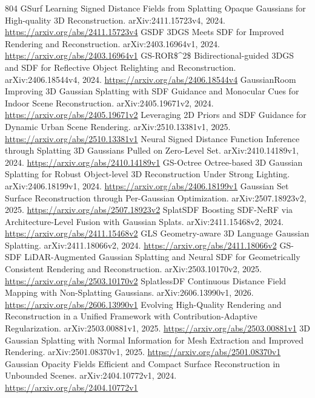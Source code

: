 \documentclass[11pt]{article}
\begin{document}
\begin{thebibliography}{804}
 GSurf Learning Signed Distance Fields from Splatting Opaque Gaussians for High-quality 3D Reconstruction. arXiv:2411.15723v4, 2024. \url{https://arxiv.org/abs/2411.15723v4}
 GSDF 3DGS Meets SDF for Improved Rendering and Reconstruction. arXiv:2403.16964v1, 2024. \url{https://arxiv.org/abs/2403.16964v1}
 GS-ROR\$\textasciicircum{}2\$ Bidirectional-guided 3DGS and SDF for Reflective Object Relighting and Reconstruction. arXiv:2406.18544v4, 2024. \url{https://arxiv.org/abs/2406.18544v4}
 GaussianRoom Improving 3D Gaussian Splatting with SDF Guidance and Monocular Cues for Indoor Scene Reconstruction. arXiv:2405.19671v2, 2024. \url{https://arxiv.org/abs/2405.19671v2}
 Leveraging 2D Priors and SDF Guidance for Dynamic Urban Scene Rendering. arXiv:2510.13381v1, 2025. \url{https://arxiv.org/abs/2510.13381v1}
 Neural Signed Distance Function Inference through Splatting 3D Gaussians Pulled on Zero-Level Set. arXiv:2410.14189v1, 2024. \url{https://arxiv.org/abs/2410.14189v1}
 GS-Octree Octree-based 3D Gaussian Splatting for Robust Object-level 3D Reconstruction Under Strong Lighting. arXiv:2406.18199v1, 2024. \url{https://arxiv.org/abs/2406.18199v1}
 Gaussian Set Surface Reconstruction through Per-Gaussian Optimization. arXiv:2507.18923v2, 2025. \url{https://arxiv.org/abs/2507.18923v2}
 SplatSDF Boosting SDF-NeRF via Architecture-Level Fusion with Gaussian Splats. arXiv:2411.15468v2, 2024. \url{https://arxiv.org/abs/2411.15468v2}
 GLS Geometry-aware 3D Language Gaussian Splatting. arXiv:2411.18066v2, 2024. \url{https://arxiv.org/abs/2411.18066v2}
 GS-SDF LiDAR-Augmented Gaussian Splatting and Neural SDF for Geometrically Consistent Rendering and Reconstruction. arXiv:2503.10170v2, 2025. \url{https://arxiv.org/abs/2503.10170v2}
 SplatlessDF Continuous Distance Field Mapping with Non-Splatting Gaussians. arXiv:2606.13990v1, 2026. \url{https://arxiv.org/abs/2606.13990v1}
 Evolving High-Quality Rendering and Reconstruction in a Unified Framework with Contribution-Adaptive Regularization. arXiv:2503.00881v1, 2025. \url{https://arxiv.org/abs/2503.00881v1}
 3D Gaussian Splatting with Normal Information for Mesh Extraction and Improved Rendering. arXiv:2501.08370v1, 2025. \url{https://arxiv.org/abs/2501.08370v1}
 Gaussian Opacity Fields Efficient and Compact Surface Reconstruction in Unbounded Scenes. arXiv:2404.10772v1, 2024. \url{https://arxiv.org/abs/2404.10772v1}

\end{thebibliography}
\end{document}
